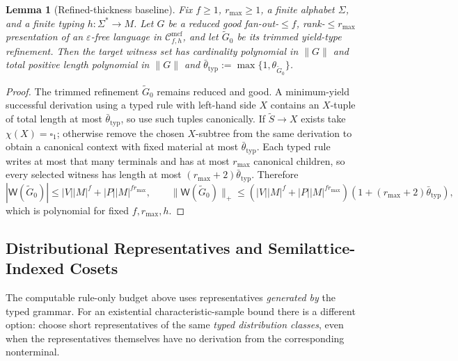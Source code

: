 \documentclass[11pt]{article}
\numberwithin{equation}{section}
\theoremstyle{plain}
\newtheorem{lemma}[theorem]{Lemma}
\theoremstyle{definition}
\theoremstyle{remark}
\newcommand{\Wit}{\mathsf{W}}
\newcommand{\Cmcf}[2]{\mathcal{C}^{\mathrm{mcf}}_{#1,#2}}
\newcommand{\blank}{\square}
\newcommand{\eps}{\varepsilon}
\theoremstyle{plain}
\begin{document}
\begin{lemma}[Refined-thickness baseline]
\label{lem:typed-thickness-baseline}
Fix $f\ge1$, $r_{\max}\ge1$, a finite alphabet $\Sigma$, and a finite
typing $h:\Sigma^*\to M$.  Let $G$ be a reduced good fan-out-$\le f$,
rank-$\le r_{\max}$ presentation of an $\eps$-free language in
$\Cmcf{f}{h}$, and let $\widetilde G_0$ be its trimmed yield-type refinement.
Then the target witness set has cardinality polynomial in $\|G\|$ and total
positive length polynomial in $\|G\|$ and
$\bar\theta_{\mathrm{typ}}:=\max\{1,\theta_{\widetilde G_0}\}$.
\end{lemma}
\begin{proof}
The trimmed refinement $\widetilde G_0$ remains reduced and good.  A
minimum-yield successful derivation using a typed rule with left-hand side
$X$ contains an $X$-tuple of total length at most
$\bar\theta_{\mathrm{typ}}$, so use such tuples canonically.  If
$\widetilde S\to X$ exists take $\chi(X)=\blank_1$; otherwise remove the
chosen $X$-subtree from the same derivation to obtain a canonical context with
fixed material at most $\bar\theta_{\mathrm{typ}}$.  Each typed rule writes at
most that many terminals and has at most $r_{\max}$ canonical children, so
every selected witness has length at most
$(r_{\max}+2)\bar\theta_{\mathrm{typ}}$.  Therefore
\[
 |\Wit(\widetilde G_0)|
 \le |V||M|^f+|P||M|^{fr_{\max}},
 \qquad
 \|\Wit(\widetilde G_0)\|_+
 \le
 (|V||M|^f+|P||M|^{fr_{\max}})
 (1+(r_{\max}+2)\bar\theta_{\mathrm{typ}}),
\]
which is polynomial for fixed $f,r_{\max},h$.
\end{proof}

\subsection{Distributional Representatives and Semilattice-Indexed Cosets}

The computable rule-only budget above uses representatives
\emph{generated by} the typed grammar.
For an existential characteristic-sample bound there is a
different option: choose short representatives of the same
\emph{typed distribution classes}, even when the representatives
themselves have no derivation from the corresponding nonterminal.
\end{document}
